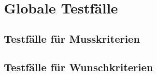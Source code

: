 \section{Globale Testfälle}
\subsection{Testfälle für Musskriterien}
\subsection{Testfälle für Wunschkriterien}